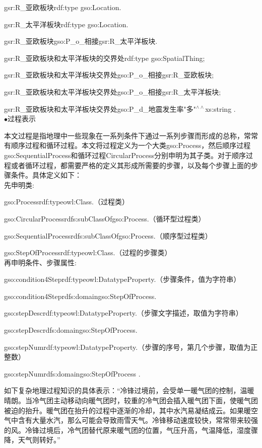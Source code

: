 gsr:R\_亚欧板块\quad rdf:type \quad gso:Location\quad .

gsr:R\_太平洋板块\quad rdf:type \quad gso:Location\quad .

gsr:R\_亚欧板块\quad gso:P\_o\_相接\quad gsr:R\_太平洋板块\quad .

gsr:R\_亚欧板块和太平洋板块的交界处\quad rdf:type \quad gso:SpatialThing\quad ;\quad 

gsr:R\_亚欧板块和太平洋板块交界处\quad gso:P\_o\_相接\quad gsr:R\_亚欧板块\quad ;

gsr:R\_亚欧板块和太平洋板块交界处\quad gso:P\_o\_相接\quad gsr:R\_太平洋板块\quad ;

gsr:R\_亚欧板块和太平洋板块交界处\quad gso:P\_d\_地震发生率\quad "多"$^{\land\land}$xs:string .
\\

$\bullet$过程表示

本文过程是指地理中一些现象在一系列条件下通过一系列步骤而形成的总称，常常有顺序过程和循环过程。本文将过程定义为一个大类gso:Process，然后顺序过程gso:SequentialProcess和循环过程CircularProcess分别申明为其子类。对于顺序过程或者循环过程，都需要严格的定义其形成所需要的步骤，以及每个步骤上面的步骤条件。具体定义如下：\\
先申明类:

gso:Process\quad rdf:type\quad owl:Class\quad .\quad （过程类）

gso:CircularProcess\quad rdfs:subClassOf\quad gso:Process\quad .（循环型过程类）

gso:SequentialProcess\quad rdfs:subClassOf\quad gso:Process\quad .\quad （顺序型过程类）

gso:StepOfProcess\quad rdf:type\quad owl:Class\quad .（过程的步骤类）
\\
再申明条件、步骤属性:

gso:condition4Step\quad rdf:type\quad owl:DatatypeProperty\quad .\quad （步骤条件，值为字符串）

gso:condition4Step\quad rdfs:domain\quad gso:StepOfProcess\quad .

gso:stepDesc\quad rdf:type\quad owl:DatatypeProperty\quad .\quad （步骤文字描述，取值为字符串）

gso:stepDesc\quad rdfs:domain\quad gso:StepOfProcess\quad .

gso:stepNum\quad rdf:type\quad owl:DatatypeProperty\quad .\quad （步骤的序号，第几个步骤，取值为正整数）

gso:stepNum\quad rdfs:domain\quad gso:StepOfProcess .

如下复杂地理过程知识的具体表示：“冷锋过境前，会受单一暖气团的控制，温暖晴朗。当冷气团主动移动向暖气团时，较重的冷气团会插入暖气团下面，使暖气团被迫的抬升。暖气团在抬升的过程中逐渐的冷却，其中水汽易凝结成云。如果暖空气中含有大量水汽，那么可能会导致雨雪天气。冷锋移动速度较快，常常带来较强的风。冷锋过境后，冷气团替代原来暖气团的位置，气压升高，气温降低，湿度骤降，天气则转好。”

